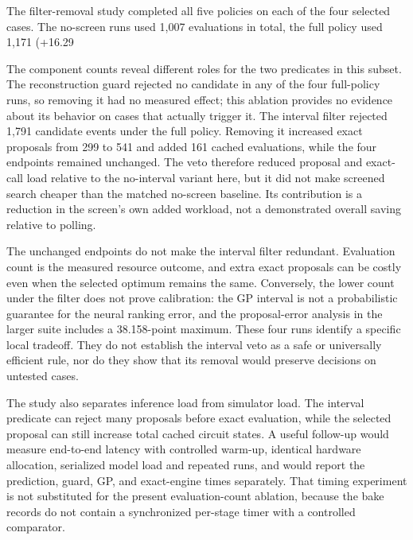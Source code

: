 \documentclass[10pt]{article}
\begin{document}
The filter-removal study completed all five policies on each of the four selected cases. The no-screen runs used 1,007 evaluations in total, the full policy used 1,171 (+16.29%

The component counts reveal different roles for the two predicates in this subset. The reconstruction guard rejected no candidate in any of the four full-policy runs, so removing it had no measured effect; this ablation provides no evidence about its behavior on cases that actually trigger it. The interval filter rejected 1,791 candidate events under the full policy. Removing it increased exact proposals from 299 to 541 and added 161 cached evaluations, while the four endpoints remained unchanged. The veto therefore reduced proposal and exact-call load relative to the no-interval variant here, but it did not make screened search cheaper than the matched no-screen baseline. Its contribution is a reduction in the screen's own added workload, not a demonstrated overall saving relative to polling.

The unchanged endpoints do not make the interval filter redundant. Evaluation count is the measured resource outcome, and extra exact proposals can be costly even when the selected optimum remains the same. Conversely, the lower count under the filter does not prove calibration: the GP interval is not a probabilistic guarantee for the neural ranking error, and the proposal-error analysis in the larger suite includes a 38.158-point maximum. These four runs identify a specific local tradeoff. They do not establish the interval veto as a safe or universally efficient rule, nor do they show that its removal would preserve decisions on untested cases.

The study also separates inference load from simulator load. The interval predicate can reject many proposals before exact evaluation, while the selected proposal can still increase total cached circuit states. A useful follow-up would measure end-to-end latency with controlled warm-up, identical hardware allocation, serialized model load and repeated runs, and would report the prediction, guard, GP, and exact-engine times separately. That timing experiment is not substituted for the present evaluation-count ablation, because the bake records do not contain a synchronized per-stage timer with a controlled comparator.
\end{document}
